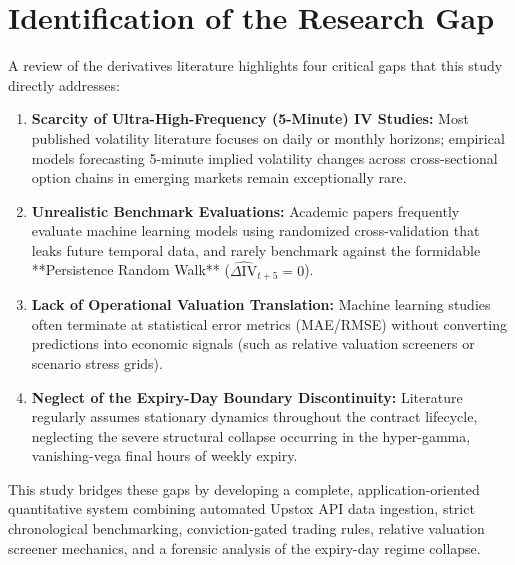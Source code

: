 \section{Identification of the Research Gap}
\label{sec:research_gap}

A review of the derivatives literature highlights four critical gaps that this study directly addresses:
\begin{enumerate}\setlength{\itemsep}{0pt}\setlength{\parskip}{0pt}
    \item \textbf{Scarcity of Ultra-High-Frequency (5-Minute) IV Studies:} Most published volatility literature focuses on daily or monthly horizons; empirical models forecasting 5-minute implied volatility changes across cross-sectional option chains in emerging markets remain exceptionally rare.
    \item \textbf{Unrealistic Benchmark Evaluations:} Academic papers frequently evaluate machine learning models using randomized cross-validation that leaks future temporal data, and rarely benchmark against the formidable **Persistence Random Walk** ($\widehat{\Delta \text{IV}}_{t+5} = 0$).
    \item \textbf{Lack of Operational Valuation Translation:} Machine learning studies often terminate at statistical error metrics (MAE/RMSE) without converting predictions into economic signals (such as relative valuation screeners or scenario stress grids).
    \item \textbf{Neglect of the Expiry-Day Boundary Discontinuity:} Literature regularly assumes stationary dynamics throughout the contract lifecycle, neglecting the severe structural collapse occurring in the hyper-gamma, vanishing-vega final hours of weekly expiry.
\end{enumerate}

This study bridges these gaps by developing a complete, application-oriented quantitative system combining automated Upstox API data ingestion, strict chronological benchmarking, conviction-gated trading rules, relative valuation screener mechanics, and a forensic analysis of the expiry-day regime collapse.
